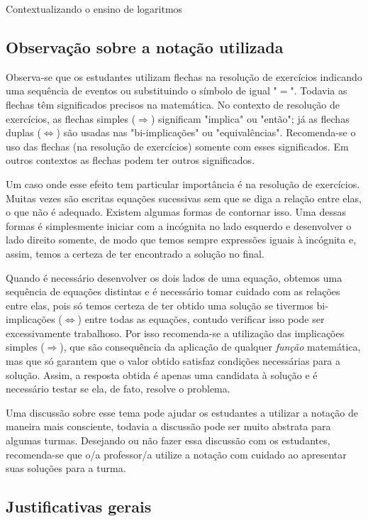 \begin{apresentacao}{Contextualizando o ensino de logaritmos}
\subsection*{Observação sobre a notação utilizada}


Observa-se que os estudantes utilizam flechas na resolução de exercícios indicando uma sequência de eventos ou substituindo o símbolo de igual "$=$". Todavia as flechas têm significados precisos na matemática. No contexto de resolução de exercícios, as flechas simples ($\Longrightarrow$) significam "implica" ou "então"; já as flechas duplas ($\Longleftrightarrow$) são usadas nas "bi-implicações" ou "equivalências". Recomenda-se o uso das flechas (na resolução de exercícios) somente com esses significados. Em outros contextos as flechas podem ter outros significados.

Um caso onde esse efeito tem particular importância é na resolução de exercícios. Muitas vezes são escritas equações sucessivas sem que se diga a relação entre elas, o que não é adequado. Existem algumas formas de contornar isso. Uma dessas formas é simplesmente iniciar com a incógnita no lado esquerdo e desenvolver o lado direito somente, de modo que temos sempre expressões iguais à incógnita e, assim, temos a certeza de ter encontrado a solução no final.

Quando é necessário desenvolver os dois lados de uma equação, obtemos uma sequência de equações distintas e é necessário tomar cuidado com as relações entre elas, pois só temos certeza de ter obtido uma solução se tivermos bi-implicações ($\Longleftrightarrow$) entre todas as equações, contudo verificar isso pode ser excessivamente trabalhoso. Por isso recomenda-se a utilização das implicações simples ($\Rightarrow$), que são consequência da aplicação de qualquer \textit{função} matemática, mas que só garantem que o valor obtido satisfaz condições necessárias para a solução. Assim, a resposta obtida é apenas uma candidata à solução e é necessário testar se ela, de fato, resolve o problema.

Uma discussão sobre esse tema pode ajudar os estudantes a utilizar a notação de maneira mais consciente, todavia a discussão pode ser muito abstrata para algumas turmas. Desejando ou não fazer essa discussão com os estudantes, recomenda-se que o/a professor/a utilize a notação com cuidado ao apresentar suas soluções para a turma.


\subsection{Justificativas gerais}


\end{apresentacao}
